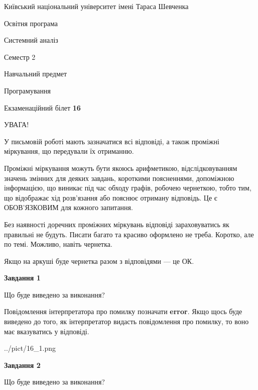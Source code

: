 \documentclass[12pt, ukrainian]{article}
\begin{document}
{{\begin {small}\par
{ \center  Київський національний університет імені Тараса Шевченка \par}
{\parbox {5 cm}{Освітня програма \hfill}{\parbox {7 cm}{Системний аналіз \hfill}}\parbox {6 cm}{\hfill Семестр 2}}\par
{\parbox {5 cm} {Навчальний предмет \hfill}\parbox {7 cm}{Програмування \hfill}\parbox {6cm}{\hfill}\par}\vspace{-7pt} \end{small}}{\center Екзаменаційний білет \No \textbf
{ 16 }\par}}
{
\begin {large}
УВАГА!

У письмовій роботі мають зазначатися всі відповіді, а також проміжні міркування, що передували їх отриманню.

Проміжні міркування можуть бути якоюсь арифметикою, відслідковуванням зна\-чень змінних для деяких завдань,
короткими поясненнями, допоміжною інформацією, що виникає під час обходу графів, робочею чернеткою,
тобто тим, що відображає хід розв’язання або пояснює отриману відповідь.
Це є ОБОВ’ЯЗКОВИМ для кожного запитання.

Без наявності доречних проміжних міркувань відповіді зараховуватись як правиль\-ні не будуть.
Писати багато та красиво оформлено не треба. Коротко, але по темі. Можли\-во, навіть чернетка.

Якщо на аркуші буде чернетка разом з відповідями --- це ОК.

\newpage

{\begin {center}\textbf{Завдання 1}\end {center}}\par
Що буде виведено за виконання?

Повідомлення інтерпретатора про помилку позначати \textbf{error}.
Якщо щось буде виведено до того, як інтерпретатор видасть повідомлення про помилку, 
то воно має вказуватись у відповіді. \par


\begin{center}
	{../pict/16_1.png}
\end{center}
\newpage

{\begin {center}\textbf{Завдання 2}\end {center}}\par
Що буде виведено за виконання?


\end{large}}
\end{document}

